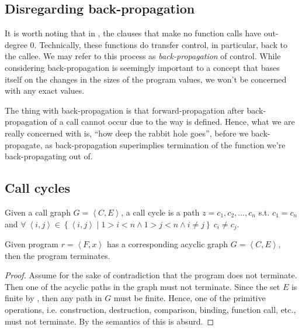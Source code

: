 
\subsection{Disregarding back-propagation}

It is worth noting that in , the clauses that
make no function calls have out-degree $0$. Technically, these functions do
transfer control, in particular, back to the callee. We may refer to this
process as \emph{back-propagation} of control. While considering
back-propagation is seemingly important to a concept that bases itself on the
changes in the sizes of the program values, we won't be concerned with any
exact values.

The thing with back-propagation is that forward-propagation after
back-propagation of a call cannot occur due to the way \D{} is defined. Hence,
what we are really concerned with is, ``how deep the rabbit hole goes'', before
we back-propagate, as back-propagation superimplies termination of the function
we're back-propagating out of.

\subsection{Call cycles}

\begin{definition}\label{definition:call-cycle} Given a call graph $G =
\left\langle C,E \right\rangle$, a call cycle is a path $z=c_1,c_2,\ldots,c_n$
s.t. $c_1=c_n$ and $\forall\ \left\langle i, j \right\rangle \in \left\{
\left\langle i,j \right\rangle \mid 1>i< n \wedge 1>j< n \wedge i\neq
j\right\}\ c_i\neq c_j$.\end{definition}

\begin{theorem}\label{theorem:acyclic-graph-terminates} Given program $r=
\left\langle F, x \right\rangle$ has a corresponding acyclic graph $G =
\left\langle C,E \right\rangle$, then the program terminates.\end{theorem}

\begin{proof} Assume for the sake of contradiction that the program does not
terminate. Then one of the acyclic paths in the graph must not terminate. Since
the set $E$ is finite by , then any path
in $G$ must be finite.  Hence, one of the primitive operations, i.e.
construction, destruction, comparison, binding, function call, etc., must not
terminate. By the semantics of \D{} this is absurd.\end{proof}

